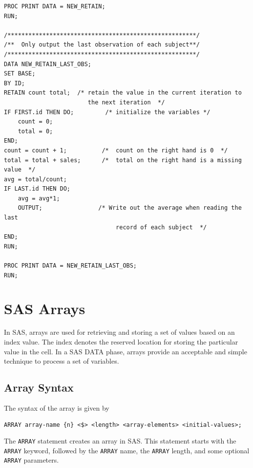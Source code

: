 \documentclass[
]{book}
\begin{document}
\begin{verbatim}
PROC PRINT DATA = NEW_RETAIN;
RUN;

/******************************************************/
/**  Only output the last observation of each subject**/
/******************************************************/
DATA NEW_RETAIN_LAST_OBS;
SET BASE;
BY ID;
RETAIN count total;  /* retain the value in the current iteration to 
                        the next iteration  */
IF FIRST.id THEN DO;         /* initialize the variables */
    count = 0;
    total = 0;
END;
count = count + 1;          /*  count on the right hand is 0  */  
total = total + sales;      /*  total on the right hand is a missing value  */
avg = total/count;                
IF LAST.id THEN DO;
    avg = avg*1;
    OUTPUT;                /* Write out the average when reading the last 
                                record of each subject  */
END;
RUN;

PROC PRINT DATA = NEW_RETAIN_LAST_OBS;
RUN;
\end{verbatim}

\hypertarget{sas-arrays}{%
\chapter{SAS Arrays}\label{sas-arrays}}

In SAS, arrays are used for retrieving and storing a set of values based on an index value. The index denotes the reserved location for storing the particular value in the cell. In a SAS DATA phase, arrays provide an acceptable and simple technique to process a set of variables.

\hypertarget{array-syntax}{%
\section{\texorpdfstring{Array \textbf{Syntax}}{Array Syntax}}\label{array-syntax}}

The syntax of the array is given by

\begin{verbatim}
ARRAY array-name {n} <$> <length> <array-elements> <initial-values>;
\end{verbatim}

The \texttt{ARRAY} statement creates an array in SAS. This statement starts with the \texttt{ARRAY} keyword, followed by the \texttt{ARRAY} name, the \texttt{ARRAY} length, and some optional \texttt{ARRAY} parameters.
\end{document}
